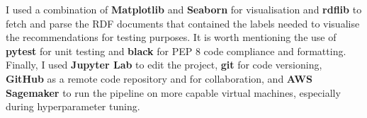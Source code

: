 I used a combination of \textbf{Matplotlib} and \textbf{Seaborn} for visualisation and \textbf{rdflib} to fetch and parse the RDF documents
that contained the labels needed to visualise the recommendations for testing purposes.
It is worth mentioning the use of \textbf{pytest} for unit testing and \textbf{black} for PEP 8 code compliance and formatting.
Finally, I used \textbf{Jupyter Lab} to edit the project, \textbf{git} for code versioning, \textbf{GitHub} as a remote code repository
and for collaboration, and \textbf{AWS Sagemaker} to run the pipeline on more capable virtual machines, especially during hyperparameter tuning.
